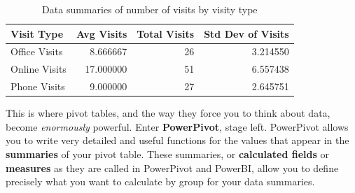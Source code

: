 \documentclass[]{book}
\newenvironment{Shaded}{\begin{snugshade}}{\end{snugshade}}
\newcommand{\DataTypeTok}[1]{\textcolor[rgb]{0.13,0.29,0.53}{#1}}
\newcommand{\KeywordTok}[1]{\textcolor[rgb]{0.13,0.29,0.53}{\textbf{#1}}}
\newcommand{\NormalTok}[1]{#1}
\newcommand{\OperatorTok}[1]{\textcolor[rgb]{0.81,0.36,0.00}{\textbf{#1}}}
\newcommand{\StringTok}[1]{\textcolor[rgb]{0.31,0.60,0.02}{#1}}
\begin{document}
\begin{Shaded}
\end{Shaded}

\begin{table}

\caption{\label{tab:unnamed-chunk-11}Data summaries of number of visits by visity type}
\centering
\begin{tabular}[t]{l|r|r|r}
\hline
Visit Type & Avg Visits & Total Visits & Std Dev of Visits\\
\hline
Office Visits & 8.666667 & 26 & 3.214550\\
\hline
Online Visits & 17.000000 & 51 & 6.557438\\
\hline
Phone Visits & 9.000000 & 27 & 2.645751\\
\hline
\end{tabular}
\end{table}

This is where pivot tables, and the way they force you to think about data, become \emph{enormously} powerful. Enter \textbf{PowerPivot}, stage left. PowerPivot allows you to write very detailed and useful functions for the values that appear in the \textbf{summaries} of your pivot table. These summaries, or \textbf{calculated fields} or \textbf{measures} as they are called in PowerPivot and PowerBI, allow you to define precisely what you want to calculate by group for your data summaries.
\end{document}
